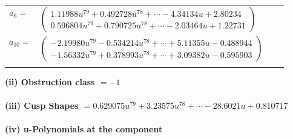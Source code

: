 \documentclass[1p]{elsarticle_modified}
\theoremstyle{definition}
\begin{document}
\begin{tabular}{m{7pt} m{180pt} m{7pt} m{180pt} }
\flushright $a_{6}=$&$\begin{pmatrix}1.11988 u^{79}+0.492728 u^{78}+\cdots-4.34134 u+2.80234\\0.596804 u^{79}+0.790725 u^{78}+\cdots-2.03464 u+1.22731\end{pmatrix}$ \\
\flushright $a_{10}=$&$\begin{pmatrix}-2.19980 u^{79}-0.534214 u^{78}+\cdots+5.11355 u-0.488944\\-1.56332 u^{79}+0.378993 u^{78}+\cdots+3.09382 u-0.595903\end{pmatrix}$\\&\end{tabular}
\flushleft \textbf{(ii) Obstruction class $= -1$}\\~\\
\flushleft \textbf{(iii) Cusp Shapes $= 0.629075 u^{79}+3.23575 u^{78}+\cdots-28.6021 u+0.810717$}\\~\\
\newpage\renewcommand{\arraystretch}{1}
\flushleft \textbf{(iv) u-Polynomials at the component}\newline \\
\end{document}
